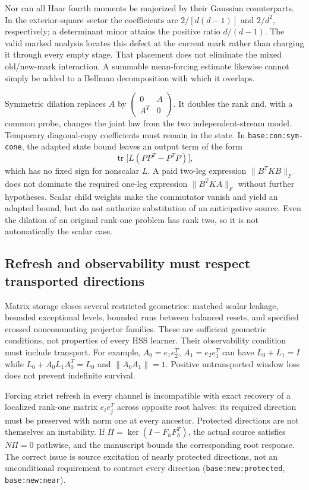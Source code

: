 \documentclass[11pt,oneside,openany,a4paper]{report}
\numberwithin{equation}{chapter}
\theoremstyle{definition}
\theoremstyle{remark}
\begin{document}
Nor can all Haar fourth moments be majorized by their Gaussian
counterparts.  In the exterior-square sector the coefficients are
$2/[d(d-1)]$ and $2/d^2$, respectively; a determinant minor attains
the positive ratio $d/(d-1)$.  The valid marked analysis locates this
defect at the current mark rather than charging it through every
empty stage.  That placement does not eliminate the mixed
old/new-mark interaction.  A summable mean-forcing estimate likewise
cannot simply be added to a Bellman decomposition with which it
overlaps.

Symmetric dilation replaces $A$ by
$\left(\begin{smallmatrix}0&A\\A^T&0\end{smallmatrix}\right)$.
It doubles the rank and, with a common probe, changes the joint law
from the two independent-stream model.  Temporary diagonal-copy
coefficients must remain in the state.  In
\texttt{base:con:sym-cone}, the adapted state bound leaves an output
term of the form
\[
 \operatorname{tr}\bigl[L(PP^T-P^TP)\bigr],
\]
which has no fixed sign for nonscalar $L$.  A paid two-leg expression
$\|B^TKB\|_F$ does not dominate the required one-leg expression
$\|B^TKA\|_F$ without further hypotheses.  Scalar child weights make
the commutator vanish and yield an adapted bound, but do not authorize
substitution of an anticipative source.  Even the dilation of an
original rank-one problem has rank two, so it is not automatically
the scalar case.

\subsection{Refresh and observability must respect transported directions}

Matrix storage closes several restricted geometries: matched scalar
leakage, bounded exceptional levels, bounded runs between balanced
resets, and specified crossed noncommuting projector families.
These are sufficient geometric conditions, not properties of every
HSS learner.  Their observability condition must include transport.
For example, $A_0=e_1e_2^T$, $A_1=e_2e_1^T$ can have
$L_0+L_1=I$ while
$L_0+A_0L_1A_0^T=L_0$ and $\|A_0A_1\|=1$.  Positive untransported
window loss does not prevent indefinite survival.

Forcing strict refresh in every channel is incompatible with exact
recovery of a localized rank-one matrix $e_ie_j^T$ across opposite
root halves: its required direction must be preserved with norm one
at every ancestor.  Protected directions are not themselves an
instability.  If
$\Pi=\ker(I-F_hF_h^T)$, the actual source satisfies $N\Pi=0$
pathwise, and the manuscript bounds the corresponding root response.
The correct issue is source excitation of nearly protected
directions, not an unconditional requirement to contract every
direction (\texttt{base:new:protected}, \texttt{base:new:near}).
\end{document}
